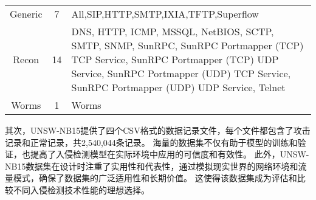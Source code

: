 \begin{table}[htbp]
\begin{tabularx}{\textwidth}{@{}ccX@{}}
		Generic                           & 7                                 & All,SIP,HTTP,SMTP,IXIA,TFTP,Superflow                                                                                                                                                                                                                                                                                                                                                                                                                                                                                                                               \\
		Recon                             & 14                                & DNS, HTTP, ICMP, MSSQL, NetBIOS, SCTP, SMTP, SNMP, SunRPC, SunRPC Portmapper (TCP) TCP Service, SunRPC Portmapper (TCP) UDP Service, SunRPC Portmapper (UDP) TCP Service, SunRPC Portmapper (UDP) UDP Service, Telnet                                                                                                                                                                                                                                                                                                                                               \\
		Worms                             & 1                                 & Worms                                                                                                                                                                                                                                                                                                                                                                                                                                                                                                                                                               \\
		\bottomrule
	\end{tabularx}
\end{table}\par

其次，UNSW-NB15提供了四个CSV格式的数据记录文件，每个文件都包含了攻击记录和正常记录，共2,540,044条记录。
海量的数据集不仅有助于模型的训练和验证，也提高了入侵检测模型在实际环境中应用的可信度和有效性。
此外，UNSW-NB15数据集在设计时注重了实用性和代表性，通过模拟现实世界的网络环境和流量模式，确保了数据集的广泛适用性和长期价值。
这使得该数据集成为评估和比较不同入侵检测技术性能的理想选择。\par

